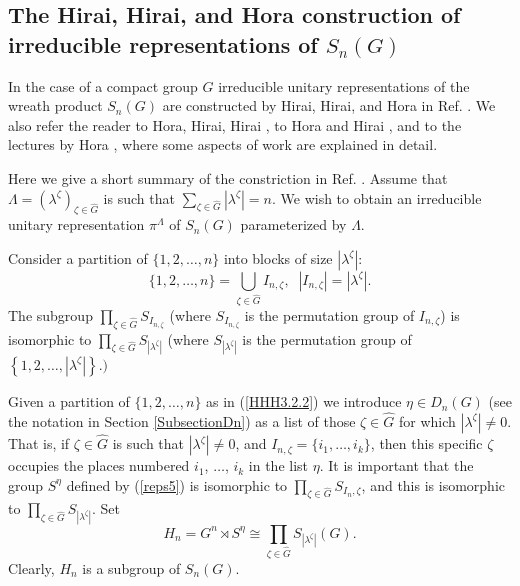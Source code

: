 \documentclass[12pt]{amsart}
\theoremstyle{definition}
\numberwithin{equation}{section}
\begin{document}
\subsection{The Hirai, Hirai, and Hora construction of irreducible
representations of $S_n(G)$}
In the case of a compact group $G$ irreducible unitary representations of the wreath product $S_n(G)$ are constructed by Hirai, Hirai, and Hora in Ref. \cite{HiraiHiraiHoraI}.
We also refer the reader to Hora, Hirai, Hirai \cite{HoraHiraiHiraiII},
to Hora and Hirai \cite{HoraHirai},  and to the lectures by Hora \cite{HoraLectures}, where
some aspects of work \cite{HiraiHiraiHoraI}
are explained in detail.

Here we give a short summary of the constriction in Ref. \cite{HiraiHiraiHoraI}. Assume that $\Lambda=\left(\lambda^{\zeta}\right)_{\zeta\in\widehat{G}}$ is such that $\sum_{\zeta\in\widehat{G}}|\lambda^{\zeta}|=n$.
We wish to obtain an irreducible unitary representation $\pi^{\Lambda}$ of $S_n(G)$ parameterized by $\Lambda$.

Consider a partition of $\{1,2,\ldots,n\}$ into blocks of size $\left|\lambda^{\zeta}\right|$:
\begin{equation}\label{HHH3.2.2}
\{1,2,\ldots,n\}=\underset{\zeta\in\widehat{G}}\bigcup I_{n,\zeta},\;\; \left|I_{n,\zeta}\right|=\left|\lambda^{\zeta}\right|.
\end{equation}
The subgroup $\prod\limits_{\zeta\in\widehat{G}}S_{I_{n,\zeta}}$
(where $S_{I_{n,\zeta}}$ is the permutation group of $I_{n,\zeta}$) is isomorphic to $\prod\limits_{\zeta\in\widehat{G}}S_{|\lambda^{\zeta}|}$
(where $S_{|\lambda^{\zeta}|}$ is the permutation group of
$
\left\{1,2,\ldots,\left|\lambda^\zeta\right|\right\}.)
$

Given a partition of $\{1,2,\ldots,n\}$ as in (\ref{HHH3.2.2}) we introduce $\eta\in \widehat{D_n(G)}$ (see the notation in Section \ref{SubsectionDn}) as a list of those $\zeta\in\widehat{G}$ for which $|\lambda^{\zeta}|\neq0$. That is, if $\zeta\in\widehat{G}$ is such that $|\lambda^{\zeta}|\neq 0$, and  $I_{n,\zeta}=\{i_1,\ldots,i_k\}$,  then this specific $\zeta$ occupies the places numbered $i_1$, $\ldots$, $i_k$ in the list $\eta$. It is important that the group $S^{\eta}$ defined by (\ref{reps5})
is isomorphic to $\prod\limits_{\zeta\in\widehat{G}}S_{I_n,\zeta}$, and this is isomorphic to
$\prod\limits_{\zeta\in\widehat{G}}S_{|\lambda^{\zeta}|}$.
Set
\begin{equation}\label{HHH3.4.1}
H_n=G^n\rtimes S^{\eta}\cong
\prod\limits_{\zeta\in\widehat{G}}S_{|\lambda^{\zeta}|}(G).
\end{equation}
Clearly, $H_n$ is a subgroup of $S_n(G)$.
\end{document}
